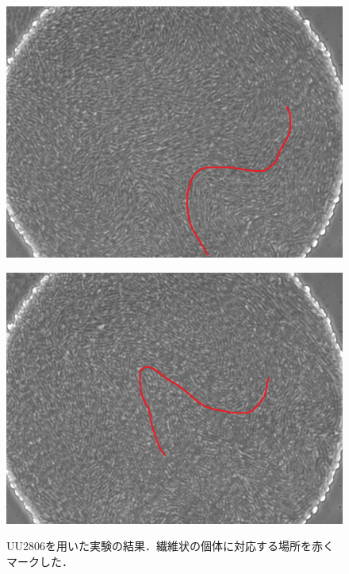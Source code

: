 \documentclass[a4paper,11pt]{jsarticle}
\begin{document}
\begin{figure}[htbp]
\begin{minipage}{0.45\linewidth}
    \includegraphics[width=\columnwidth]{Series015_t150000_RAW_ch00.png}
    \label{fig:06_3_pt}
  \end{minipage}
  \begin{minipage}{0.45\linewidth}
    \centering
    \includegraphics[width=\columnwidth]{Series015_t180000_RAW_ch00.png}
    \label{fig:06_4_pt}
  \end{minipage}
  \caption{UU2806を用いた実験の結果．繊維状の個体に対応する場所を赤くマークした．}
\end{figure}
\end{document}
